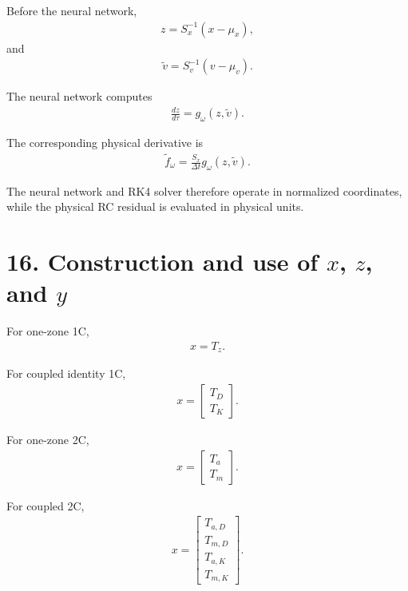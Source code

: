 \documentclass[11pt]{article}
\begin{document}
Before the neural network,
\begin{align}
\boxed{z=S_x^{-1}(x-\mu_x),}
\tag{P4.64}
\end{align}
and
\begin{align}
\boxed{\widetilde v=S_v^{-1}(v-\mu_v).}
\tag{P4.65}
\end{align}

The neural network computes
\begin{align}
\boxed{\frac{dz}{d\tau}=g_\omega(z,\widetilde v).}
\tag{P4.66}
\end{align}

The corresponding physical derivative is
\begin{align}
\boxed{
\widetilde f_\omega
=
\frac{S_x}{\Delta t}g_\omega(z,\widetilde v).
}
\tag{P4.67}
\end{align}

The neural network and RK4 solver therefore operate in normalized coordinates, while the physical RC residual is evaluated in physical units.

\section*{16. Construction and use of \(x\), \(z\), and \(y\)}

For one-zone 1C,
\begin{align}
\boxed{x=T_z.}
\tag{P4.68}
\end{align}

For coupled identity 1C,
\begin{align}
\boxed{
x=
\begin{bmatrix}
T_D\\T_K
\end{bmatrix}.
}
\tag{P4.69}
\end{align}

For one-zone 2C,
\begin{align}
\boxed{
x=
\begin{bmatrix}
T_a\\T_m
\end{bmatrix}.
}
\tag{P4.70}
\end{align}

For coupled 2C,
\begin{align}
\boxed{
x=
\begin{bmatrix}
T_{a,D}\\T_{m,D}\\T_{a,K}\\T_{m,K}
\end{bmatrix}.
}
\tag{P4.71}
\end{align}
\end{document}
